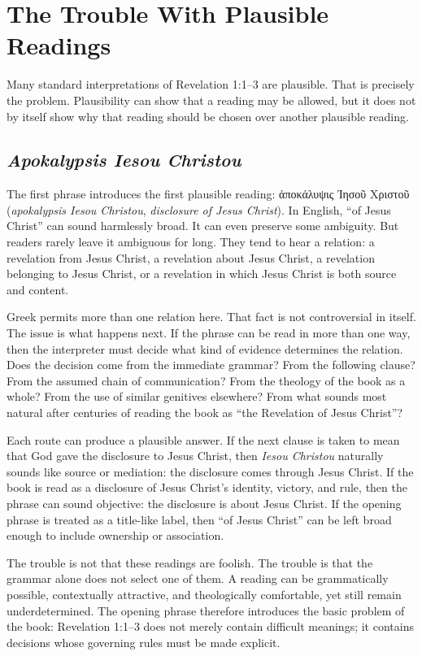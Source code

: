\chapter{The Trouble With Plausible Readings}

Many standard interpretations of Revelation 1:1--3 are plausible. That is precisely the problem. Plausibility can show that a reading may be allowed, but it does not by itself show why that reading should be chosen over another plausible reading.

\section{\textit{Apokalypsis Iesou Christou}}

The first phrase introduces the first plausible reading: \textgreek{ἀποκάλυψις Ἰησοῦ Χριστοῦ} (\textit{apokalypsis Iesou Christou}, \textit{disclosure of Jesus Christ}). In English, ``of Jesus Christ'' can sound harmlessly broad. It can even preserve some ambiguity. But readers rarely leave it ambiguous for long. They tend to hear a relation: a revelation from Jesus Christ, a revelation about Jesus Christ, a revelation belonging to Jesus Christ, or a revelation in which Jesus Christ is both source and content.

Greek permits more than one relation here. That fact is not controversial in itself. The issue is what happens next. If the phrase can be read in more than one way, then the interpreter must decide what kind of evidence determines the relation. Does the decision come from the immediate grammar? From the following clause? From the assumed chain of communication? From the theology of the book as a whole? From the use of similar genitives elsewhere? From what sounds most natural after centuries of reading the book as ``the Revelation of Jesus Christ''?

Each route can produce a plausible answer. If the next clause is taken to mean that God gave the disclosure to Jesus Christ, then \textit{Iesou Christou} naturally sounds like source or mediation: the disclosure comes through Jesus Christ. If the book is read as a disclosure of Jesus Christ's identity, victory, and rule, then the phrase can sound objective: the disclosure is about Jesus Christ. If the opening phrase is treated as a title-like label, then ``of Jesus Christ'' can be left broad enough to include ownership or association.

The trouble is not that these readings are foolish. The trouble is that the grammar alone does not select one of them. A reading can be grammatically possible, contextually attractive, and theologically comfortable, yet still remain underdetermined. The opening phrase therefore introduces the basic problem of the book: Revelation 1:1--3 does not merely contain difficult meanings; it contains decisions whose governing rules must be made explicit.

